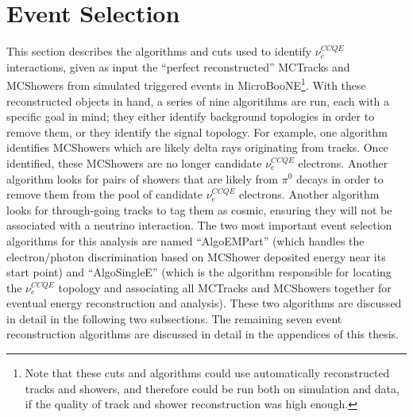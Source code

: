 \section{Event Selection}\label{LEE_eventselection_section}
This section describes the algorithms and cuts used to identify $\nu_e^{CCQE}$ interactions, given as input the ``perfect reconstructed'' {\sc MCTracks} and {\sc MCShowers} from simulated triggered events in MicroBooNE\footnote{Note that these cuts and algorithms could use automatically reconstructed tracks and showers, and therefore could be run both on simulation and data, if the quality of track and shower reconstruction was high enough.}. With these reconstructed objects in hand, a series of nine algoritihms are run, each with a specific goal in mind; they either identify background topologies in order to remove them, or they identify the signal topology. For example, one algorithm identifies {\sc MCShowers} which are likely delta rays originating from tracks. Once identified, these {\sc MCShowers} are no longer candidate $\nu_e^{CCQE}$ electrons. Another algorithm looks for pairs of showers that are likely from $\pi^0$ decays in order to remove them from the pool of candidate $\nu_e^{CCQE}$ electrons. Another algorithm looks for through-going tracks to tag them as cosmic, ensuring they will not be associated with a neutrino interaction. The two most important event selection algorithms for this analysis are named ``AlgoEMPart'' (which handles the electron/photon discrimination based on {\sc MCShower} deposited energy near its start point) and ``AlgoSingleE'' (which is the algorithm responsible for locating the $\nu_e^{CCQE}$ topology and associating all {\sc MCTracks} and {\sc MCShowers} together for eventual energy reconstruction and analysis). These two algorithms are discussed in detail in the following two subsections. The remaining seven event reconstruction algorithms are discussed in detail in the appendices of this thesis.


